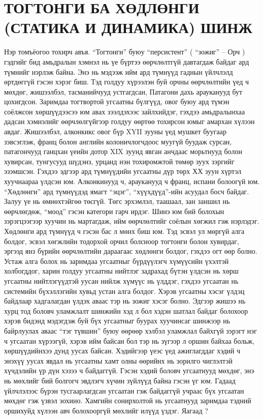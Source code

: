 \section{ТОГТОНГИ БА ХӨДЛӨНГИ (СТАТИКА И ДИНАМИКА) ШИНЖ}
Нэр томъёогоо тохирч авъя. “Тогтонги” буюу “персистент” ( “зожиг” – Орч ) гэдгийг бид амьдралын хэмнэл нь үе бүртээ өөрчлөлтгүй давтагдаж байдаг ард түмнийг нэрлэж байна. Энэ нь мэдээж ийм ард түмнүүд гаднын үйлчлэлд өртдөггүй гэсэн хэрэг биш. Тэд голдуу хүрээлэн буй орчны өөрчлөлтийн үед ч мөхдөг, жишээлбэл, тасманийчууд устгагдсан, Патагони дахь арауканууд бут цохигдсон. Заримдаа тогтвортой угсаатны бүлгүүд, овог буюу ард түмэн соёлжсон хөршүүдээсээ юм авах зээлдэхээс зайлхийдэг, гэхдээ амьдралынхаа дадсан хэмнэлийг өөрчлөлгүйгээр голдуу өөртөө тохирсон юмыг амархан хүлээн авдаг. Жишээлбэл, алконкикс овог бүр XYII зууны үед мушкет буугаар зэвсэглэж, франц болон английн колоничлогчдоос муугүй буудаж сурсан, патагончууд ганцхан үеийн дотор XIX зуунд явган анчдаас морьтнууд болон хувирсан, тунгусууд шүдэнз, урцанд нэн тохиромжтой төмөр зуух зэргийг эзэмшсэн. Гэхдээ эдгээр ард түмнүүдийн угсаатны дүр төрх ХХ зуун хүртэл хуучнаараа үлдсэн юм. Алконкинууд ч, арауканууд ч франц, испани болоогүй юм.
“Хөдлөнги” ард түмнүүдэд ямагт “эцэг”, “хүүхдүүд”-ийн асуудал босч байдаг. Залуу үе нь өмнөхтэйгөө төсгүй. Төгс эрхэмлэл, таашаал, зан заншил нь өөрчлөгдөж, “моод” гэсэн категори гарч ирдэг. Шинэ юм бий болохын зэрэгцээгээр хуучин нь мартагдаж, ийм өөрчлөлтийг соёлын хөгжил гэж нэрлэдэг.
Хөдлөнги ард түмнүүд ч гэсэн бас л мөнх биш юм. Тэд эсвэл ул мөргүй алга болдог, эсвэл хөгжлийн тодорхой орчил болсноор тогтонги болон хувирдаг, эргээд янз бүрийн өөрчлөлтийн дараагаас хөдлөнги болдог, гэхдээ огт өөр болно. Устаж алга болох нь заримдаа угсаатныг бүрдүүлэгч хүмүүсийн үхэлтэй холбогддог, харин голдуу угсаатны нийтлэг задрахад бүтэн үлдсэн нь хөрш угсаатны нийтлэгүүдтэй уусан нийлж хүмүүс нь үлддэг, гэхдээ угсаатан нь системийн бүхэллэгийн хувьд устан алга болдог. Хэрэв угсаатны хэсэг үлдэц байдлаар хадгалагдан үлдэх аваас тэр нь зожиг хэсэг болно.
Эдгээр жишээ нь хурц тод боловч уламжлалт шинжийн хэд л бол хэдэн шатлал байдаг болохоор хэрэв бидэнд мэдэгдэж буй бүх угсаатныг буурах хуучинсаг шинжээр нь байрлуулах аваас “тэг түвшин” буюу өөрөөр хэлбэл уламжлал байхгүй зэрэгт нэг ч угсаатан хүрээгүй, хэрэв ийм байсан бол тэр нь зүгээр л оршин байхаа больж, хөршүүдийнхээ дунд уусах байсан. Хэдийгээр үеэс үед ажиглагддаг хэдий ч энэхүү уусах явдал нь угсаатны хамт олны өөрийнх нь зорилго чиглэлтэй хүчдэлийн үр дүн хэзээ ч байдаггүй. Гэсэн хэдий боловч угсаатнууд мөхдөг, энэ нь мөхлийг бий болгогч эвдлэгч хүчин зүйлүүд байна гэсэн үг юм. Гадаад үйлчлэлээс бүрэн тусгаарлагдсан угсаатан гэж байдаггүй учраас бүх угсаатан мөхдөг гэж үзвэл зохино. Хамгийн сонирхолтой нь угсаатнууд заримдаа тэдний оршихуйд хүлээн авч болохооргүй мөхлийг илүүд үздэг. Яагаад ?
